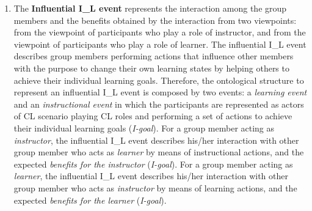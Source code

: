 \begin{enumerate} [label=(\alph*)]
\item
The \textbf{Influential I\_L event} represents the interaction among the group members and the benefits obtained by the interaction from two viewpoints: from the viewpoint of participants who play a role of instructor, and from the viewpoint of participants who play a role of learner. The influential I\_L event describes group members performing actions that influence other members with the purpose to change their own learning states by helping others to achieve their individual learning goals. Therefore, the ontological structure to represent an influential I\_L event is composed by two events: a \emph{learning event} and an \emph{instructional event} in which the participants are represented as actors of CL scenario playing CL roles and performing a set of actions to achieve their individual learning goals (\emph{I-goal}). For a group member acting as \emph{instructor}, the influential I\_L event describes his/her interaction with other group member who acts as \emph{learner} by means of instructional actions, and the expected \emph{benefits for the instructor} (\emph{I-goal}). For a group member acting as \emph{learner}, the influential I\_L event describes his/her interaction with other group member who acts as \emph{instructor} by means of learning actions, and the expected \emph{benefits for the learner} (\emph{I-goal}).
\end{enumerate}

